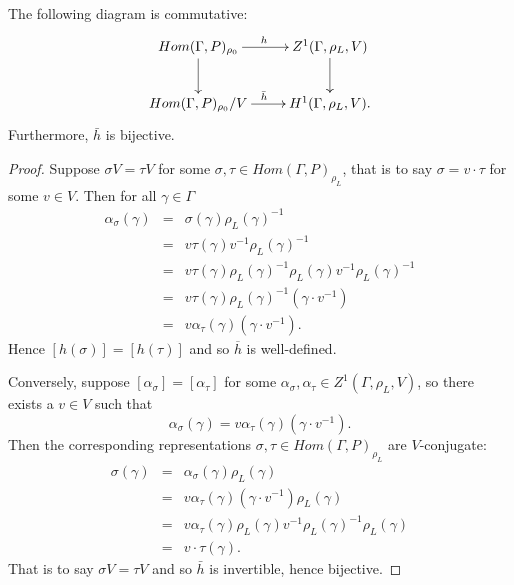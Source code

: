 \begin{lemma}
  The following diagram is commutative:
  \begin{displaymath}
    \xymatrix{
    Hom(\Gamma, P)_{\rho_{0}} \ar[r]^h \ar[d] & Z^{1}(\Gamma, \rho_L, V) \ar[d] \\
    Hom(\Gamma, P)_{\rho_{0}}/V \ar[r]^{\bar{h}} & H^{1}(\Gamma, \rho_L, V).
    }
  \end{displaymath}
  Furthermore, $\bar{h}$ is bijective.
  \label{lem:v_h1}
\end{lemma}
\begin{proof}  
  Suppose $\sigma V = \tau V$ for some $\sigma,\tau\in Hom(\Gamma, P)_{\rho_L}$, that is to say $\sigma = v\cdot\tau$ for some $v\in V$. Then for all $\gamma\in \Gamma$
  \begin{eqnarray*}
    \alpha_\sigma(\gamma) &=& \sigma(\gamma)\rho_L(\gamma)^{-1}\\
    &=& v\tau(\gamma)v^{-1}\rho_L(\gamma)^{-1}\\
    &=& v\tau(\gamma)\rho_L(\gamma)^{-1}\rho_L(\gamma)v^{-1}\rho_L(\gamma)^{-1}\\
    &=& v\tau(\gamma)\rho_L(\gamma)^{-1}(\gamma\cdot v^{-1})\\
    &=& v\alpha_\tau(\gamma)(\gamma\cdot v^{-1}).
  \end{eqnarray*}
  Hence $[h(\sigma)] = [h(\tau)]$ and so $\overline{h}$ is well-defined. 
  
  Conversely, suppose $[\alpha_\sigma] = [\alpha_\tau]$ for some $\alpha_\sigma, \alpha_\tau \in Z^1(\Gamma, \rho_L, V)$, so there exists a $v \in V$ such that
  \begin{displaymath}
    \alpha_\sigma(\gamma) = v \alpha_\tau(\gamma)(\gamma \cdot v^{-1}).
  \end{displaymath}
  Then the corresponding representations $\sigma, \tau \in Hom(\Gamma, P)_{\rho_L}$ are $V$-conjugate:
  \begin{eqnarray*}
    \sigma(\gamma) &=&  \alpha_\sigma(\gamma)\rho_L(\gamma) \\
    &=& v \alpha_\tau(\gamma)(\gamma \cdot v^{-1}) \rho_L(\gamma) \\
    &=& v \alpha_\tau(\gamma)\rho_L(\gamma) v^{-1} \rho_L(\gamma)^{-1} \rho_L(\gamma) \\
    &=& v \cdot \tau(\gamma).
  \end{eqnarray*}
  That is to say $\sigma V = \tau V$ and so $\bar{h}$ is invertible, hence bijective.
\end{proof}

